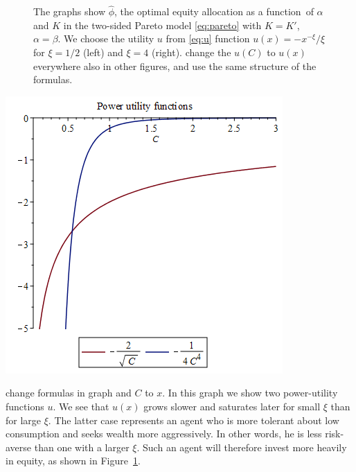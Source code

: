 \documentclass[11pt,a4]{amsart}
\newcommand{\red}{\color{darkred}}
\newcommand{\fct}{function}
\newcommand{\1}{{\mathbf 1}}
\begin{document}
\begin{figure}
\begin{minipage}{0.5\linewidth}
  \end{minipage}
  \caption{The graphs show $\hat\phi$, the optimal equity allocation
    as a \fct\ of $\alpha$ and $K$ in the two-sided Pareto model
    \eqref{eq:pareto} with $K=K'$, $\alpha=\beta$. We choose
    the utility $u$ from \eqref{eq:u}
    function $u(x) = -x^{-\xi}/\xi$ for $\xi = 1/2$ (left) and $\xi = 4$
    (right). {\rm change the $u(C)$ to $u(x)$ everywhere also in other
      figures, and use the same structure of the formulas.}
  }
  \label{fig:phi_hat_pareto}
\end{figure}

\begin{minipage}{0.5\linewidth}
  \includegraphics[width=\textwidth]{power_utilities.png}
\end{minipage}\hfill
\begin{minipage}{0.42\textwidth}{\red change formulas in graph and $C$ to $x$.}
  In this graph we show two power-utility functions $u$. We see that $u(x)$ grows slower
  and saturates later for small $\xi$ than for large $\xi$. The latter case
  represents an agent who is more tolerant about low
  consumption and seeks wealth more aggressively. In other
  words, he is less risk-averse than one with a larger $\xi$.
  Such an agent will therefore invest more heavily in equity, as shown in Figure~\ref{fig:phi_hat_pareto}.
\end{minipage}
\end{document}
